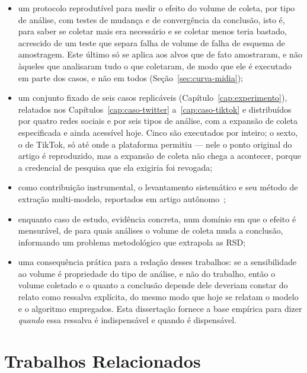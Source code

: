 \begin{itemize}
  \item um protocolo reprodutível para medir o efeito do volume de coleta, por tipo
  de análise, com testes de mudança e de convergência da conclusão, isto é, para
  saber se coletar mais era necessário e se coletar menos teria bastado, acrescido de um
  teste que separa falha de volume de falha de esquema de amostragem. Este último
  só se aplica aos alvos que de fato amostraram, e não àqueles que analisaram tudo
  o que coletaram, de modo que ele é executado em parte dos casos, e não em todos
  (Seção~\ref{sec:curva-midia});
  \item um conjunto fixado de seis casos replicáveis
  (Capítulo~\ref{cap:experimento}), relatados nos
  Capítulos~\ref{cap:caso-twitter} a~\ref{cap:caso-tiktok} e distribuídos por quatro
  redes sociais e por seis tipos de análise, com a expansão de coleta especificada e
  ainda acessível hoje. Cinco são executados por inteiro; o sexto, o de TikTok, só
  até onde a plataforma permitiu --- nele o ponto original do artigo é reproduzido,
  mas a expansão de coleta não chega a acontecer, porque a credencial de pesquisa
  que ela exigiria foi revogada;
  \item como contribuição instrumental, o levantamento sistemático e seu método de
  extração multi-modelo, reportados em artigo autônomo~\cite{barreto2026survey};
  \item enquanto caso de estudo, evidência concreta, num domínio em que o efeito é
  mensurável, de para quais análises o volume de coleta muda a conclusão,
  informando um problema metodológico que extrapola as RSD;
  \item uma consequência prática para a redação desses trabalhos: se a
  sensibilidade ao volume é propriedade do tipo de análise, e não do trabalho, então
  o volume coletado e o quanto a conclusão depende dele deveriam constar do relato
  como ressalva explícita, do mesmo modo que hoje se relatam o modelo e o algoritmo
  empregados. Esta dissertação fornece a base empírica para dizer \emph{quando} essa
  ressalva é indispensável e quando é dispensável.
\end{itemize}

\chapter{Trabalhos Relacionados}
\label{cap:relacionados}

